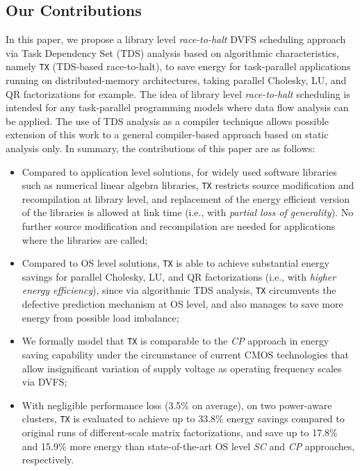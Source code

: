 \documentclass[12pt]{elsarticle}
\begin{document}
\subsection{Our Contributions}

In this paper, we propose a library level \emph{race-to-halt} DVFS scheduling approach via Task Dependency Set (TDS) analysis based on algorithmic characteristics, namely \texttt{TX} (TDS-based race-to-halt), to save energy for task-parallel applications running on distributed-memory architectures, taking parallel Cholesky, LU, and QR factorizations for example. The idea of library level \emph{race-to-halt} scheduling is intended for any task-parallel programming models where data flow analysis can be applied. The use of TDS analysis as a compiler technique allows possible extension of this work to a general compiler-based approach based on static analysis only. In summary, the contributions of this paper are as follows:

\begin{itemize}
\item Compared to application level solutions, for widely used software libraries such as numerical linear algebra libraries, \texttt{TX} restricts source modification and recompilation at library level, and replacement of the energy efficient version of the libraries is allowed at link time (i.e., with \emph{partial loss of generality}). No further source modification and recompilation are needed for applications where the libraries are called;\item Compared to OS level solutions, \texttt{TX} is able to achieve substantial energy savings for parallel Cholesky, LU, and QR factorizations (i.e., with \emph{higher energy efficiency}), since via algorithmic TDS analysis, \texttt{TX} circumvents the defective prediction mechanism at OS level, and also manages to save more energy from possible load imbalance;\item We formally model that \texttt{TX} is comparable to the \emph{CP} approach in energy saving capability under the circumstance of current CMOS technologies that allow insignificant variation of supply voltage as operating frequency scales via DVFS;
\item With negligible performance loss (3.5\% on average), on two power-aware clusters, \texttt{TX} is evaluated to achieve up to 33.8\% energy savings compared to original runs of different-scale matrix factorizations, and save up to 17.8\% and 15.9\% more energy than state-of-the-art OS level \emph{SC} and \emph{CP} approaches, respectively.\end{itemize}
\end{document}
